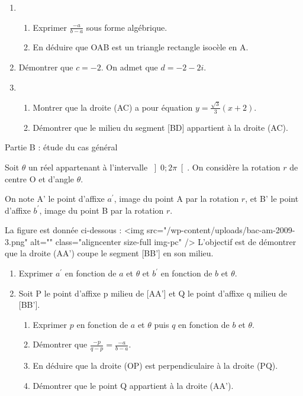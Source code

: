 \begin{center}
\end{center}
\begin{enumerate}
     \item
     \begin{enumerate}[label=\alph*.]
          \item
          Exprimer $\frac{- a}{b-a}$ sous forme algébrique.
          \item
          En déduire que OAB est un triangle rectangle isocèle en A.
     \end{enumerate}
     \item
     Démontrer que $c=-2$. On admet que $d=-2-2i$.
     \item
     \begin{enumerate}[label=\alph*.]
          \item
          Montrer que la droite (AC) a pour équation $y=\frac{\sqrt{3}}{3}\left(x+ 2\right)$.
          \item
          Démontrer que le milieu du segment [BD] appartient à la droite (AC).
     \end{enumerate}
\end{enumerate}
\begin{h3}Partie B : étude du cas général\end{h3}
Soit $\theta $ un réel appartenant à l'intervalle $\left]0; 2\pi \right[$. On considère la rotation $r$ de centre O et d'angle $\theta $.
\par
On note A' le point d'affixe $a^{\prime}$, image du point A par la rotation $r$, et B' le point d'affixe $b^{\prime}$, image du point B par la rotation $r$.
\par
La figure est donnée ci-dessous :
<img src="/wp-content/uploads/bac-am-2009-3.png" alt="" class="aligncenter size-full  img-pc" />
L'objectif est de démontrer que la droite (AA') coupe le segment [BB'] en son milieu.
\begin{enumerate}
     \item
     Exprimer $a^{\prime}$ en fonction de $a$ et $\theta $ et $b^{\prime}$ en fonction de $b$ et $\theta $.
     \item
     Soit P le point d'affixe p milieu de [AA'] et Q le point d'affixe q milieu de [BB'].
     \begin{enumerate}[label=\alph*.]
          \item
          Exprimer $p$ en fonction de $a$ et $\theta $ puis $q$ en fonction de $b$ et $\theta $.
          \item
          Démontrer que $\frac{-p}{q-p}=\frac{- a}{b-a}$.
          \item
          En déduire que la droite (OP) est perpendiculaire à la droite (PQ).
          \item
          Démontrer que le point Q appartient à la droite (AA').
     \end{enumerate}
\end{enumerate}
